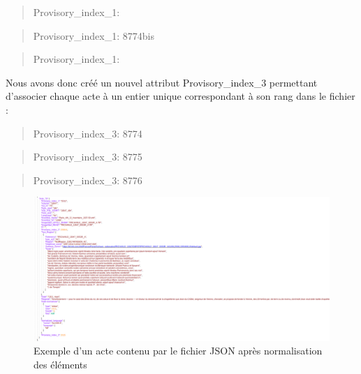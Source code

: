 \documentclass[a4paper,12pt,twoside]{book}
\begin{document}
	\begin{quotation}
		\textquotesingle Provisory\_index\_1\textquotesingle : \textquotesingle
	\end{quotation}
	
	\begin{quotation}
		\textquotesingle Provisory\_index\_1\textquotesingle : \textquotesingle 8774bis\textquotesingle
	\end{quotation}

	\begin{quotation}
		\textquotesingle Provisory\_index\_1\textquotesingle : \textquotesingle
	\end{quotation}
	
	\noindent Nous avons donc créé un nouvel attribut \og Provisory\_index\_3\fg{} permettant d'associer chaque acte à un entier unique correspondant à son rang dans le fichier :
	
	\begin{quotation}
		\textquotesingle Provisory\_index\_3\textquotesingle : 8774
	\end{quotation}

	\begin{quotation}
		\textquotesingle Provisory\_index\_3\textquotesingle : 8775
	\end{quotation}
	
	\begin{quotation}
		\textquotesingle Provisory\_index\_3\textquotesingle : 8776
	\end{quotation}

	\begin{figure}
		\centering
		\includegraphics[width=\textwidth]{Images/json_modifie.png}
		\caption{Exemple d'un acte contenu par le fichier JSON après normalisation des éléments}
		\label{json_final}
	\end{figure}
	
\end{document}
